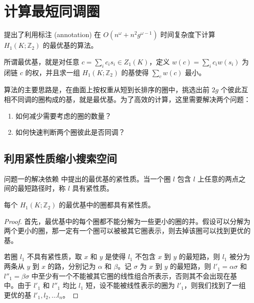 \section{计算最短同调圈}
\label{sec:shortest-h1m}

\citet{Busaryev2012} 提出了利用标注 (annotation) 在 $ O(n^\omega + n^2 g^{\omega - 1}) $ 时间复杂度下计算 $ H_1(K; \mathbb{Z}_2) $ 的最优基的算法。

所谓最优基，就是对任意 $ c = \sum_i c_i s_i \in Z_1(K) $，定义 $ w(c) = \sum_i c_i w(s_i) $ 为闭链 $ c $ 的权，并且求一组 $ H_1(K; \mathbb{Z}_2) $ 的基使得 $ \sum_{c} w(c) $ 最小。

算法的主要思路是，在曲面上按权重从短到长排序的圈中，挑选出前 $ 2g $ 个彼此互相不同调的圈构成的基，就是最优基。为了高效的计算，这里需要解决两个问题：
\begin{enumerate}
    \item 如何减少需要考虑的圈的数量？
    \item 如何快速判断两个圈彼此是否同调？
\end{enumerate}

\subsection{利用紧性质缩小搜索空间}

问题一的解决依赖 \citet{Erickson2005} 中提出的最优基的紧性质。当一个圈 $ l $ 包含 $ l $ 上任意的两点之间的最短路径时，称 $ l $ 具有紧性质。

\begin{proposition}
    每个 $ H_1(K; \mathbb{Z}_2) $ 的最优基中的圈都具有紧性质。
\end{proposition}
\begin{proof}
    首先，最优基中的每个圈都不能分解为一些更小的圈的并。假设可以分解为两个更小的圈，那一定有一个圈可以被被其它圈表示，则去掉该圈可以找到更优的基。

    若圈 $ l_1 $ 不具有紧性质，取 $ x $ 和 $ y $ 是使得 $ l_1 $ 不包含 $ x $ 到 $ y $ 的最短路，则 $ l_1 $ 被分为两条从 $ y $ 到 $ x $ 的路，分别记为 $ \alpha $ 和 $ \beta $。记 $ \sigma $ 为 $ x $ 到 $ y $ 的最短路，则 $ l'_1 = \alpha \sigma $ 和 $ l''_1 = \beta \sigma $ 中至少有一个不能被其它圈的线性组合所表示，否则其不会出现在基中。由于 $ l'_1 $ 和 $ l''_1 $ 均比 $ l_1 $ 短，设不能被线性表示的圈为 $ l'_1 $，则我们找到了一组更优的基 $ l'_1, l_2, \dots l_{n} $。
\end{proof}

